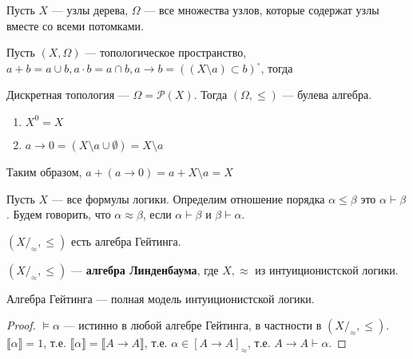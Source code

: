 \documentclass[12pt, a4paper, oneside]{book}
\begin{document}
\begin{example}
    Пусть \(X\) --- узлы дерева, \(\Omega\) --- все множества узлов, которые содержат узлы вместе со всеми потомками.
\end{example}

\begin{theorem}
    Пусть \((X,\Omega)\) --- топологическое пространство, \(a + b = a\cup b, a\cdot b = a \cap b, a \to b = ((X\setminus a)\subset b)^\circ\), тогда \? %
\end{theorem}

\begin{example}
    Дискретная топология --- \(\Omega = \mathcal{P}(X)\). Тогда \((\Omega, \leq )\) --- булева алгебра.
\end{example}

\begin{enumerate}
    \item \(X^0 = X\)
    \item \(a \to 0 = (X\setminus a \cup \emptyset) = X\setminus a\)
\end{enumerate}

Таким образом, \(a + (a \to 0) = a + X\setminus a = X\)

\begin{definition}
    Пусть \(X\) --- все формулы логики. Определим отношение порядка \(\alpha \leq \beta\) это \(\alpha \vdash \beta\). Будем говорить, что \(\alpha \approx \beta\), если \(\alpha \vdash \beta\) и \(\beta \vdash \alpha\).

    \((X /_\approx, \leq )\) есть алгебра Гейтинга.
\end{definition}

\begin{definition}
    \((X /_\approx, \leq )\) --- \textbf{алгебра Линденбаума}, где \(X, \approx\) из интуиционистской логики.
\end{definition}

\begin{theorem}
    Алгебра Гейтинга --- полная модель интуиционистской логики.
\end{theorem}
\begin{proof}
    \(\models \alpha\) --- истинно в любой алгебре Гейтинга, в частности в \((X /_\approx, \leq )\). \(\llbracket \alpha \rrbracket = 1\), т.е. \(\llbracket \alpha \rrbracket = \llbracket A \to A \rrbracket\), т.е. \(\alpha \in [A \to A]_\approx\), т.е. \(A \to A \vdash \alpha\).
\end{proof}
\end{document}
